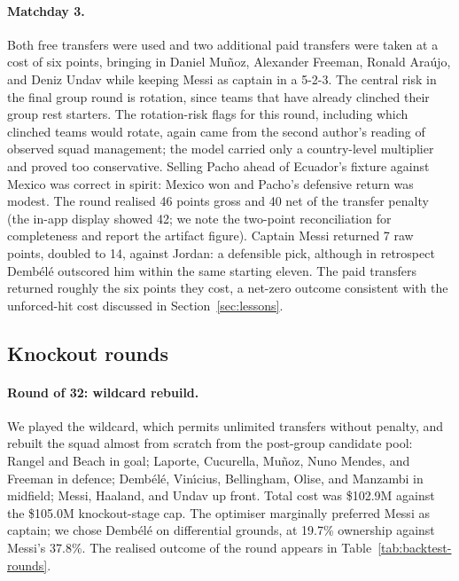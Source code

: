 \paragraph{Matchday 3.}
Both free transfers were used and two additional paid transfers were
taken at a cost of six points, bringing in Daniel Mu\~noz, Alexander
Freeman, Ronald Ara\'ujo, and Deniz Undav while keeping Messi as
captain in a 5-2-3. The central risk in the final group round is
rotation, since teams that have already clinched their group rest
starters. The rotation-risk flags for this round, including which
clinched teams would rotate, again came from the second author's
reading of observed squad management; the model carried only a
country-level multiplier and proved too conservative. Selling Pacho
ahead of Ecuador's fixture against Mexico was correct in spirit:
Mexico won and Pacho's defensive return was modest. The round
realised 46 points gross and 40 net of the transfer penalty (the
in-app display showed 42; we note the two-point reconciliation for
completeness and report the artifact figure). Captain Messi returned
7 raw points, doubled to 14, against Jordan: a defensible pick,
although in retrospect Demb\'el\'e outscored him within the same
starting eleven. The paid transfers returned roughly the six points
they cost, a net-zero outcome consistent with the unforced-hit cost
discussed in Section~\ref{sec:lessons}.

\subsection{Knockout rounds}
\label{sec:live-knockout}

\paragraph{Round of 32: wildcard rebuild.}
We played the wildcard, which permits unlimited transfers without
penalty, and rebuilt the squad almost from scratch from the
post-group candidate pool: Rangel and Beach in goal; Laporte,
Cucurella, Mu\~noz, Nuno Mendes, and Freeman in defence;
Demb\'el\'e, Vin\'{\i}cius, Bellingham, Olise, and Manzambi in
midfield; Messi, Haaland, and Undav up front. Total cost was
\$102.9M against the \$105.0M knockout-stage cap. The optimiser
marginally preferred Messi as captain; we chose Demb\'el\'e on
differential grounds, at 19.7\% ownership against Messi's 37.8\%.
The realised outcome of the round appears in
Table~\ref{tab:backtest-rounds}.


